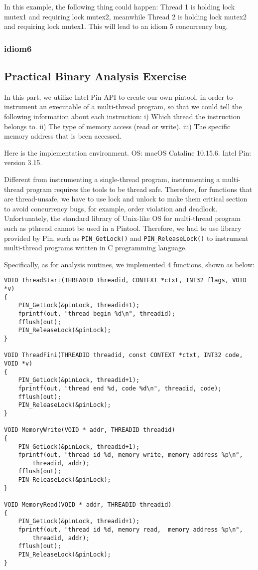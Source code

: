 \documentclass[twocolumn]{article}
\begin{document}
In this example, the following thing could happen: Thread 1 is holding lock mutex1 and requiring lock mutex2, meanwhile Thread 2 is holding lock mutex2 and requiring lock mutex1. This will lead to an idiom 5 concurrency bug. 


\subsubsection{idiom6}

\subsection{Practical Binary Analysis Exercise}

In this part, we utilize Intel Pin API to create our own pintool, in order to instrument an executable of a multi-thread program, so that we could tell the following information about each instruction: i) Which thread the instruction belongs to. ii) The type of memory access (read or write). iii) The specific memory address that is been accessed. 

Here is the implementation environment. OS: macOS Cataline 10.15.6. Intel Pin: version 3.15. 

Different from instrumenting a single-thread program, instrumenting a multi-thread program requires the tools to be thread safe. Therefore, for functions that are thread-unsafe, we have to use lock and unlock to make them critical section to avoid concurrency bugs, for example, order violation and deadlock. Unfortunately, the standard library of Unix-like OS for multi-thread program such as pthread cannot be used in a Pintool. Therefore, we had to use library provided by Pin, such as \texttt{PIN\_GetLock()} and \texttt{PIN\_ReleaseLock()} to instrument multi-thread programs written in C programming language. 

Specifically, as for analysis routines, we implemented 4 functions, shown as below: 

\begin{lstlisting}
VOID ThreadStart(THREADID threadid, CONTEXT *ctxt, INT32 flags, VOID *v)
{
	PIN_GetLock(&pinLock, threadid+1);
	fprintf(out, "thread begin %d\n", threadid);
	fflush(out);
	PIN_ReleaseLock(&pinLock);
}

VOID ThreadFini(THREADID threadid, const CONTEXT *ctxt, INT32 code, VOID *v)
{
	PIN_GetLock(&pinLock, threadid+1);
	fprintf(out, "thread end %d, code %d\n", threadid, code);
	fflush(out);
	PIN_ReleaseLock(&pinLock);
}

VOID MemoryWrite(VOID * addr, THREADID threadid)
{
	PIN_GetLock(&pinLock, threadid+1);
	fprintf(out, "thread id %d, memory write, memory address %p\n", 
		threadid, addr);
	fflush(out);
	PIN_ReleaseLock(&pinLock);
}

VOID MemoryRead(VOID * addr, THREADID threadid)
{
	PIN_GetLock(&pinLock, threadid+1);
	fprintf(out, "thread id %d, memory read,  memory address %p\n",
		threadid, addr);
	fflush(out);
	PIN_ReleaseLock(&pinLock);
}
\end{lstlisting}
\end{document}
